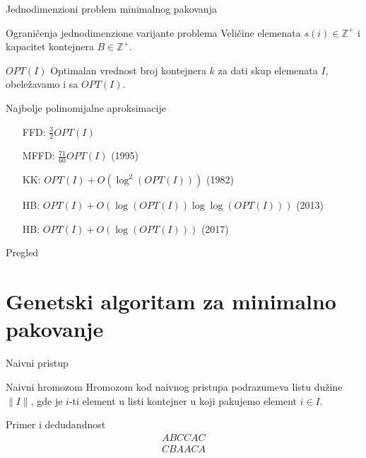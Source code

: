 \documentclass[aspectratio=169,xcolor=dvipsnames]{beamer}
\begin{document}
\begin{frame}[t]{Jednodimenzioni problem minimalnog pakovanja}
    \begin{block}{Ograničenja jednodimenzione varijante problema}
        Veličine elemenata $s(i) \in \mathbb{Z}^{+}$ i
        kapacitet kontejnera $B \in \mathbb{Z}^{+}$.
    \end{block}
    \begin{block}{$OPT(I)$}
        Optimalan vrednost broj kontejnera $k$ za dati skup elemenata $I$, 
        obeležavamo i sa $OPT(I)$.
    \end{block}
    \begin{exampleblock}{Najbolje polinomijalne aproksimacije}
        \begin{enumerate}
            \item [FFD:] $\frac{3}{2} OPT(I)$
            \item [MFFD:] $\frac{71}{60} OPT(I)$ (1995)
            \item [KK:] $OPT(I) + O(\log^2 (OPT(I)))$ (1982)
            \item [HB:] $OPT(I) + O(\log(OPT(I))\log\log(OPT(I)))$ (2013)
            \item [HB:] $OPT(I) + O(\log(OPT(I)))$ (2017)
        \end{enumerate}
    \end{exampleblock}
\end{frame}


\begin{frame}{Pregled}
    \tableofcontents
\end{frame}

\section{Genetski algoritam za minimalno pakovanje}

\begin{frame}{Naivni pristup}
    \begin{block}{Naivni hromozom}
        Hromozom kod naivnog pristupa podrazumeva listu dužine $\|I\|$, 
        gde je $i$-ti element u listi kontejner u koji pakujemo 
        element $i \in I$.
    \end{block}
    \begin{exampleblock}{Primer i dedudandnost}
        \[
            \begin{aligned}
                ABCCAC \\
                CBAACA
            \end{aligned}
        \]
    \end{exampleblock}
\end{frame}
\end{document}
